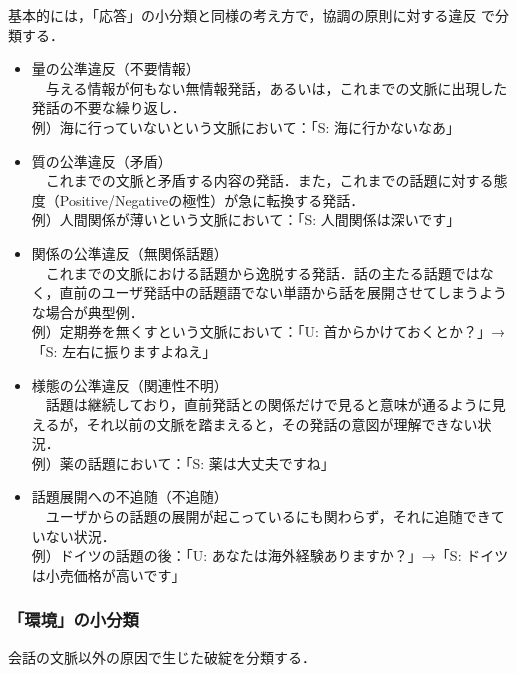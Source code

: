 \documentclass[japanese]{jnlp_1.4}
\begin{document}
基本的には，「応答」の小分類と同様の考え方で，協調の原則に対する違反
で分類する．

\begin{itemize}
\item 量の公準違反（不要情報）\\
　与える情報が何もない無情報発話，あるいは，これまでの文脈に出現した発話の不要な繰り返し．\\
例）海に行っていないという文脈において：「S: 海に行かないなあ」

\item 質の公準違反（矛盾）\\
　これまでの文脈と矛盾する内容の発話．また，これまでの話題に対する態度（Positive/Negativeの極性）が急に転換する発話．\\
例）人間関係が薄いという文脈において：「S: 人間関係は深いです」

\item 関係の公準違反（無関係話題）\\
　これまでの文脈における話題から逸脱する発話．話の主たる話題ではなく，直前のユーザ発話中の話題語でない単語から話を展開させてしまうような場合が典型例．\\
例）定期券を無くすという文脈において：「U: 首からかけておくとか？」→「S: 左右に振りますよねえ」

\item 様態の公準違反（関連性不明）\\
　話題は継続しており，直前発話との関係だけで見ると意味が通るように見えるが，それ以前の文脈を踏まえると，その発話の意図が理解できない状況．\\
例）薬の話題において：「S: 薬は大丈夫ですね」

\item 話題展開への不追随（不追随）\\
 　ユーザからの話題の展開が起こっているにも関わらず，それに追随できていない状況．\\
例）ドイツの話題の後：「U: あなたは海外経験ありますか？」→「S: ドイツは小売価格が高いです」

\end{itemize}


\subsubsection{「環境」の小分類}

会話の文脈以外の原因で生じた破綻を分類する．
\end{document}

